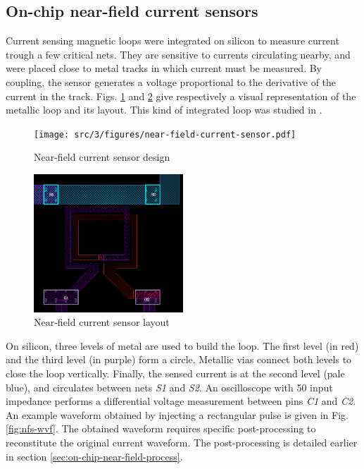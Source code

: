 \subsection{On-chip near-field current sensors}

Current sensing magnetic loops were integrated on silicon to measure current trough a few critical nets.
They are sensitive to currents circulating nearby, and were placed close to metal tracks in which current must be measured.
By coupling, the sensor generates a voltage proportional to the derivative of the current in the track.
Figs. \ref{fig:near-field-current-sensor} and \ref{fig:near-field-current-sensor-layout} give respectively a visual representation of the metallic loop and its layout.
This kind of integrated loop was studied in \cite{OtherInductors, InductorsLAAS1, InductorsLAAS2, AlainSallesInductors}.

\begin{figure}[!h]
  \centering
  \texttt{[image: src/3/figures/near-field-current-sensor.pdf]}
  \caption{Near-field current sensor design}
  \label{fig:near-field-current-sensor}
\end{figure}

\begin{figure}[!h]
  \centering
  \includegraphics[width=0.5\textwidth]{src/3/figures/sensor_layout.png}
  \caption{Near-field current sensor layout}
  \label{fig:near-field-current-sensor-layout}
\end{figure}

On silicon, three levels of metal are used to build the loop.
The first level (in red) and the third level (in purple) form a circle.
Metallic vias connect both levels to close the loop vertically.
Finally, the sensed current is at the second level (pale blue), and circulates between nets \textit{S1} and \textit{S2}.
An oscilloscope with 50\textOmega{} input impedance performs a differential voltage measurement between pins \textit{C1} and \textit{C2}.
An example waveform obtained by injecting a rectangular pulse is given in Fig. \ref{fig:nfs-wvf}.
The obtained waveform requires specific post-processing to reconstitute the original current waveform.
The post-processing is detailed earlier in section \ref{sec:on-chip-near-field-process}.


